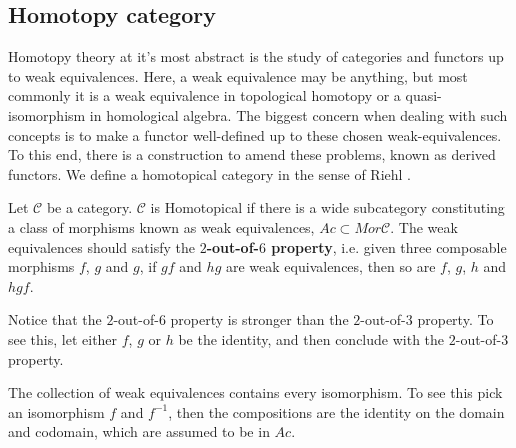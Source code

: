 \documentclass[../thesis.tex]{subfiles}
\begin{document}
        \subsection{Homotopy category}

            Homotopy theory at it's most abstract is the study of categories and functors up to weak equivalences. Here, a weak equivalence may be anything, but most commonly it is a weak equivalence in topological homotopy or a quasi-isomorphism in homological algebra. The biggest concern when dealing with such concepts is to make a functor well-defined up to these chosen weak-equivalences. To this end, there is a construction to amend these problems, known as derived functors. We define a homotopical category in the sense of Riehl \cite{Riehl16}.

            \begin{definition}
                Let $\mathcal{C}$ be a category. $\mathcal{C}$ is Homotopical if there is a wide subcategory constituting a class of morphisms known as weak equivalences, $Ac\subset Mor\mathcal{C}$. The weak equivalences should satisfy the \textbf{$2$-out-of-$6$ property}, i.e. given three composable morphisms $f$, $g$ and $g$, if $gf$ and $hg$ are weak equivalences, then so are $f$, $g$, $h$ and $hgf$.

                \begin{center}
                \end{center}
            \end{definition}

            \begin{remark}
                Notice that the $2$-out-of-$6$ property is stronger than the $2$-out-of-$3$ property. To see this, let either $f$, $g$ or $h$ be the identity, and then conclude with the $2$-out-of-$3$ property.
            \end{remark}

            \begin{remark}
                The collection of weak equivalences contains every isomorphism. To see this pick an isomorphism $f$ and $f^{-1}$, then the compositions are the identity on the domain and codomain, which are assumed to be in $Ac$.
            \end{remark}
            
\end{document}
